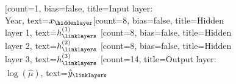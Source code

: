 \documentclass{standalone}
\begin{document}
    \begin{neuralnetwork}[height=14]
        \newcommand{\x}[2]{$x_#2$}
	\newcommand{\Year}[2]{\small$\text{Year}_i$}
	\newcommand{\y}[2]{$\hat{y}_{#2}$}
        \newcommand{\mort}[2]{$\hat{\mu}_#2$}
        \newcommand{\hfirst}[2]{\small $h^{(1)}_#2$}
        \newcommand{\hsecond}[2]{\small $h^{(2)}_#2$}
        \newcommand{\hthird}[2]{\small $h^{(3)}_#2$}
	[count=1, bias=false, title=Input layer:\\Year, text=\x]
        \hiddenlayer[count=8, bias=false, title=Hidden\\layer 1, text=\hfirst] \linklayers
        \hiddenlayer[count=8, bias=false, title=Hidden\\layer 2, text=\hsecond] \linklayers
        \hiddenlayer[count=8, bias=false, title=Hidden\\layer 3, text=\hthird] \linklayers
	\outputlayer[count=14, title=Output layer:\\$\log(\hat{\mu})$, text=\y] \linklayers
    \end{neuralnetwork}
\end{document}
